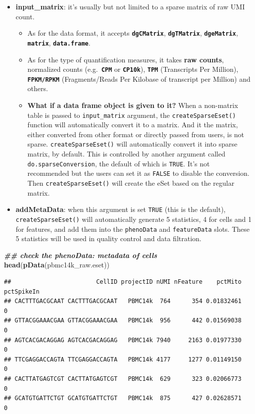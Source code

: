 \documentclass[
  12pt,
]{book}
\newenvironment{Shaded}{\begin{snugshade}}{\end{snugshade}}
\newcommand{\DocumentationTok}[1]{\textcolor[rgb]{0.56,0.35,0.01}{\textbf{\textit{#1}}}}
\newcommand{\FunctionTok}[1]{\textcolor[rgb]{0.13,0.29,0.53}{\textbf{#1}}}
\newcommand{\NormalTok}[1]{#1}
\providecommand{\tightlist}{%
  \setlength{\itemsep}{0pt}\setlength{\parskip}{0pt}}
\begin{document}
\begin{itemize}
\tightlist
\item
  \textbf{input\_matrix}: it's usually but not limited to a sparse matrix of raw UMI count.

  \begin{itemize}
  \tightlist
  \item
    As for the data format, it accepts \textbf{\texttt{dgCMatrix}}, \textbf{\texttt{dgTMatrix}}, \textbf{\texttt{dgeMatrix}}, \textbf{\texttt{matrix}}, \textbf{\texttt{data.frame}}.
  \item
    As for the type of quantification measures, it takes \textbf{raw counts}, normalized counts (e.g.~\textbf{\texttt{CPM}} or \textbf{\texttt{CP10k}}), \textbf{\texttt{TPM}} (Transcripts Per Million), \textbf{\texttt{FPKM/RPKM}} (Fragments/Reads Per Kilobase of transcript per Million) and others.
  \item
    \textbf{What if a data frame object is given to it?} When a non-matrix table is passed to \texttt{input\_matrix} argument, the \texttt{createSparseEset()} function will automatically convert it to a matrix. And it the matrix, either converted from other format or directly passed from users, is not sparse. \texttt{createSparseEset()} will automatically convert it into sparse matrix, by default. This is controlled by another argument called \texttt{do.sparseConversion}, the default of which is \texttt{TRUE}. It's not recommended but the users can set it as \texttt{FALSE} to disable the conversion. Then \texttt{createSparseEset()} will create the eSet based on the regular matrix.
  \end{itemize}
\item
  \textbf{addMetaData}: when this argument is set \texttt{TRUE} (this is the default), \texttt{createSparseEset()} will automatically generate 5 statistics, 4 for cells and 1 for features, and add them into the \texttt{phenoData} and \texttt{featureData} slots. These 5 statistics will be used in quality control and data filtration.
\end{itemize}

\begin{Shaded}
\begin{Highlighting}[]
\DocumentationTok{\#\# check the phenoData: metadata of cells}
\FunctionTok{head}\NormalTok{(}\FunctionTok{pData}\NormalTok{(pbmc14k\_raw.eset))}
\end{Highlighting}
\end{Shaded}

\begin{verbatim}
##                        CellID projectID nUMI nFeature    pctMito pctSpikeIn
## CACTTTGACGCAAT CACTTTGACGCAAT   PBMC14k  764      354 0.01832461          0
## GTTACGGAAACGAA GTTACGGAAACGAA   PBMC14k  956      442 0.01569038          0
## AGTCACGACAGGAG AGTCACGACAGGAG   PBMC14k 7940     2163 0.01977330          0
## TTCGAGGACCAGTA TTCGAGGACCAGTA   PBMC14k 4177     1277 0.01149150          0
## CACTTATGAGTCGT CACTTATGAGTCGT   PBMC14k  629      323 0.02066773          0
## GCATGTGATTCTGT GCATGTGATTCTGT   PBMC14k  875      427 0.02628571          0
\end{verbatim}
\end{document}
